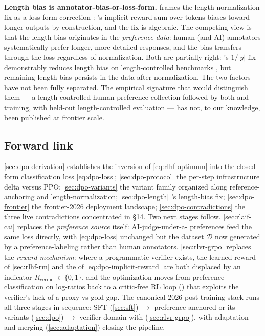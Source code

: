 \begin{contradiction}
\textbf{Length bias is annotator-bias-or-loss-form.}  frames the
length-normalization fix as a loss-form correction
\citep[\S 3]{meng2024-simpo}: 's implicit-reward sum-over-tokens
biases toward longer outputs by construction, and the fix is
algebraic. The competing view is that the length bias originates in
the \emph{preference data}: human (and AI) annotators systematically
prefer longer, more detailed responses, and the bias transfers
through the loss regardless of normalization. Both are partially
right: 's $1/|y|$ fix demonstrably reduces length bias on
length-controlled benchmarks \citep[\S 4]{meng2024-simpo}, but
remaining length bias persists in the data after normalization. The
two factors have not been fully separated. The empirical signature
that would distinguish them --- a length-controlled human preference
collection followed by both  and  training, with held-out
length-controlled evaluation --- has not, to our knowledge, been
published at frontier scale.
\end{contradiction}

\subsection{Forward link}
\label{sec:dpo-forward}

\cref{sec:dpo-derivation} establishes the inversion of
\cref{eq:rlhf-optimum} into the closed-form classification loss
\cref{eq:dpo-loss}; \cref{sec:dpo-protocol} the per-step
infrastructure delta versus PPO; \cref{sec:dpo-variants} the variant
family organized along reference-anchoring and length-normalization;
\cref{sec:dpo-length} 's length-bias fix; \cref{sec:dpo-frontier}
the frontier-2026 deployment landscape; \cref{sec:dpo-contradictions}
the three live contradictions concentrated in \S 14. Two next stages
follow. \cref{sec:rlaif-cai} replaces the \emph{preference source}
itself: AI-judge-under-a- preferences feed the same 
loss directly, with \cref{eq:dpo-loss} unchanged but the dataset
$\mathcal{D}$ now generated by a preference-labeling  rather than
human annotators. \cref{sec:rlvr-grpo} replaces the \emph{reward
mechanism}: where a programmatic verifier exists, the learned reward
of \cref{sec:rlhf-rm} and the  of
\cref{eq:dpo-implicit-reward} are both displaced by an indicator
$R_{\mathrm{verifier}} \in \{0, 1\}$, and the optimization moves from
preference classification on log-ratios back to a critic-free RL loop
() that exploits the verifier's lack of a proxy-vs-gold gap. The
canonical 2026 post-training stack runs all three stages in sequence:
SFT (\cref{sec:sft}) $\to$ preference-anchored  or its variants
(\cref{sec:dpo}) $\to$ verifier-domain  with 
(\cref{sec:rlvr-grpo}), with adaptation and merging
(\cref{sec:adaptation}) closing the pipeline.
